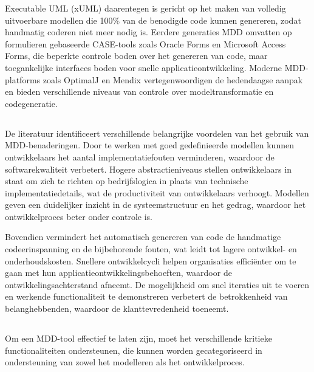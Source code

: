 Executable UML (xUML) daarentegen is gericht op het maken van volledig uitvoerbare modellen die 100\% van de benodigde code kunnen genereren, zodat handmatig coderen niet meer nodig is. Eerdere generaties MDD omvatten op formulieren gebaseerde CASE-tools zoals Oracle Forms en Microsoft Access Forms, die beperkte controle boden over het genereren van code, maar toegankelijke interfaces boden voor snelle applicatieontwikkeling. Moderne MDD-platforms zoals OptimalJ en Mendix vertegenwoordigen de hedendaagse aanpak en bieden verschillende niveaus van controle over modeltransformatie en codegeneratie.

\subsection{}%
De literatuur identificeert verschillende belangrijke voordelen van het gebruik van MDD-benaderingen. Door te werken met goed gedefinieerde modellen kunnen ontwikkelaars het aantal implementatiefouten verminderen, waardoor de softwarekwaliteit verbetert. Hogere abstractieniveaus stellen ontwikkelaars in staat om zich te richten op bedrijfslogica in plaats van technische implementatiedetails, wat de productiviteit van ontwikkelaars verhoogt. Modellen geven een duidelijker inzicht in de systeemstructuur en het gedrag, waardoor het ontwikkelproces beter onder controle is.

Bovendien vermindert het automatisch genereren van code de handmatige codeerinspanning en de bijbehorende fouten, wat leidt tot lagere ontwikkel- en onderhoudskosten. Snellere ontwikkelcycli helpen organisaties efficiënter om te gaan met hun applicatieontwikkelingsbehoeften, waardoor de ontwikkelingsachterstand afneemt. De mogelijkheid om snel iteraties uit te voeren en werkende functionaliteit te demonstreren verbetert de betrokkenheid van belanghebbenden, waardoor de klanttevredenheid toeneemt.

\subsection{}%
Om een MDD-tool effectief te laten zijn, moet het verschillende kritieke functionaliteiten ondersteunen, die kunnen worden gecategoriseerd in ondersteuning van zowel het modelleren als het ontwikkelproces.

